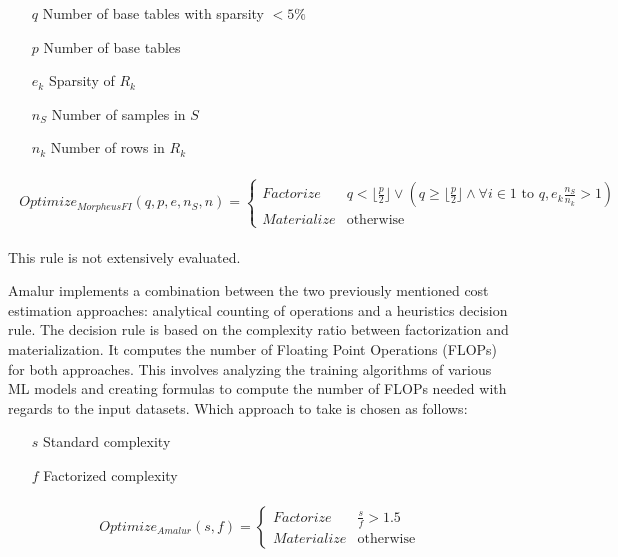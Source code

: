 \begin{definition}

	\begin{itemize}
		\item[]
			\item[$q$]Number of base tables with sparsity $ < 5\% $
		\item[$p$] Number of base tables
		\item[$e_k$] Sparsity of $R_k$
		\item[$n_S$] Number of samples in $S$
		\item[$n_k$] Number of rows in $R_k$
	\end{itemize}

	\small{
		\begin{align*}
			\begin{split}
				Optimize_{MorpheusFI}(q, p, e, n_S, n) =  \begin{cases}Factorize &q < \lfloor \frac{p}{2} \rfloor \vee ( q \geq \lfloor \frac{p}{2} \rfloor \wedge \forall i \in 1 \text{ to } q, e_k \frac{n_S}{n_k} > 1) \\Materialize & \text{otherwise}\end{cases}
			\end{split}
		\end{align*}
	}
\end{definition}
This rule is not extensively evaluated.

Amalur \cite{schijndel_cost_estimation} implements a combination between the two previously mentioned cost estimation approaches: analytical counting of operations and a heuristics decision rule. The decision rule is based on the complexity ratio between factorization and materialization. It computes the number of Floating Point Operations (FLOPs) for both approaches. This involves analyzing the training algorithms of various ML models and creating formulas to compute the number of FLOPs needed with regards to the input datasets. Which approach to take is chosen as follows:

\begin{definition}

	\begin{itemize}
		\item[]
		\item[$s$] Standard complexity
		\item[$f$] Factorized complexity
	\end{itemize}

	\small{
		\begin{align*}
			\begin{split}
				Optimize_{Amalur}(s, f) =  \begin{cases}Factorize&\frac{s}{f} > 1.5 \\Materialize & \text{otherwise}\end{cases}
			\end{split}
		\end{align*}
	}
\end{definition}

